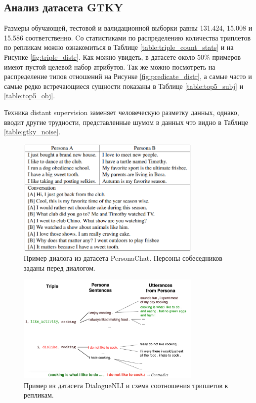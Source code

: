 \subsection{Анализ датасета GTKY}

Размеры обучающей, тестовой и валидационной выборки равны 131.424, 15.008 и 15.586 соответственно. Cо статистиками по распределению количества триплетов по репликам можно ознакомиться в Таблице \ref{table:triple_count_stats} и на Рисунке \ref{fig:triple_distr}. Как можно увидеть, в датасете около 50\% примеров имеют пустой целевой набор атрибутов. Так же можно посмотреть на распределение типов отношений на Рисунке \ref{fig:predicate_distr}, а самые часто и самые редко встречающиеся сущности показаны в Таблице \ref{table:top5_subj} и \ref{table:top5_obj}.

Техника distant supervision заменяет человеческую разметку данных, однако, вводит другие трудности, представленные шумом в данных что видно в Таблице \ref{table:gtky_noise}.
 
\begin{figure}[!ht]
    \centering
    \includegraphics[width=0.8\textwidth]{images/pc_example.png}
    \caption{Пример диалога из датасета PersonaChat. Персоны собеседников заданы перед диалогом.}
    \label{fig:pc_sample}
\end{figure}

\begin{figure}[!ht]
    \centering
    \includegraphics[width=0.8\textwidth]{images/dnli_example.png}
    \caption{Пример из датасета DialogueNLI и схема соотношения триплетов к репликам.}
    \label{fig:dnli_sample}
\end{figure}


